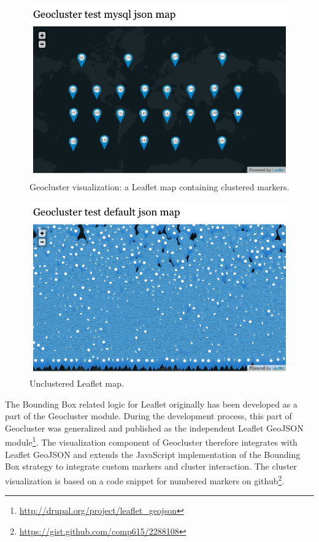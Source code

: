 \begin{figure}[h]
  \begin{center}
    \includegraphics[width=1\textwidth]{figures/map_clustered.png}
    \caption{Geocluster visualization: a Leaflet map containing clustered markers.}
    \label{fig:map-clustered}
  \end{center}
\end{figure}

\begin{figure}[h]
  \begin{center}
    \includegraphics[width=1\textwidth]{figures/map_unclustered.png}
    \caption{Unclustered Leaflet map.}
    \label{fig:map-unclustered}
  \end{center}
\end{figure}


The Bounding Box related logic for Leaflet originally has been developed as a part of the Geocluster module. During the development process, this part of Geocluster was generalized and published as the independent Leaflet GeoJSON module\footnote{\url{http://drupal.org/project/leaflet_geojson}}. The visualization component of Geocluster therefore integrates with Leaflet GeoJSON and extends the JavaScript implementation of the Bounding Box strategy to integrate custom markers and cluster interaction. The cluster visualization is based on a code snippet for numbered markers on github\footnote{\url{https://gist.github.com/comp615/2288108}}.



